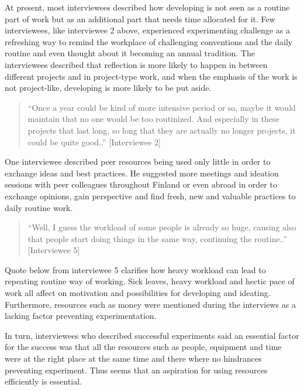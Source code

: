 At present, most interviewees described how developing is not seen as a routine part of work but as an additional part that needs time allocated for it. Few interviewees, like interviewee 2 above, experienced experimenting challenge as a refreshing way to remind the workplace of challenging conventions and the daily routine and even thought about it becoming an annual tradition. The interviewees described that reflection is more likely to happen in between different projects and in project-type work, and when the emphasis of the work is not project-like, developing is more likely to be put aside. 
\begin{quote}
``Once a year could be kind of more intensive period or so, maybe it would maintain that no one would be too routinized. And especially in these projects that last long, so long that they are actually no longer projects, it could be quite good..'' [Interviewee 2]
\end{quote}
One interviewee described peer resources being used only little in order to exchange ideas and best practices. He suggested more meetings and ideation sessions with peer colleagues throughout Finland or even abroad in order to exchange opinions, gain perspective and find fresh, new and valuable practices to daily routine work. 
\begin{quote}
``Well, I guess the workload of some people is already so huge, causing also that people start doing things in the same way, continuing the routine..'' [Interviewee 5]
\end{quote}
Quote below from interviewee 5 clarifies how heavy workload can lead to repeating routine way of working. Sick leaves, heavy workload and hectic pace of work all affect on motivation and possibilities for developing and ideating. Furthermore, resources such as money were mentioned during the interviews as a lacking factor preventing experimentation. 

In turn, interviewees who described successful experiments said an essential factor for the success was that all the resources such as people, equipment and time were at the right place at the same time and there where no hindrances preventing experiment. Thus seems that an aspiration for using resources efficiently is essential. 


